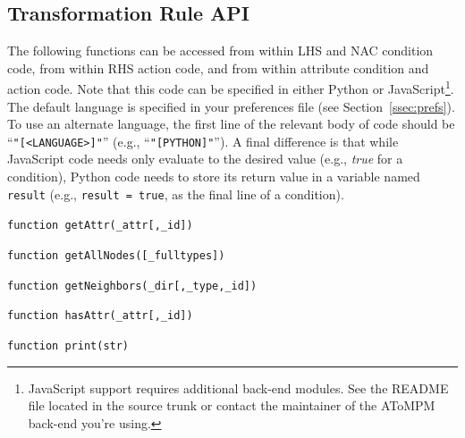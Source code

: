 \documentclass{article}
\numberwithin{equation}{section}
\numberwithin{figure}{section}
\begin{document}
\subsection{Transformation Rule API}
\label{ssec:trapi}
The following functions can be accessed from within LHS and NAC condition code, from within RHS action code, and from within attribute condition and action code. Note that this code can be specified in either Python or JavaScript\footnote{JavaScript support requires additional back-end modules. See the README file located in the source trunk or contact the maintainer of the AToMPM back-end you're using.}. The default language is specified in your preferences file (see Section~\ref{ssec:prefs}). To use an alternate language, the first line of the relevant body of code should be ``\texttt{"[<LANGUAGE>]"}'' (e.g., ``\texttt{"[PYTHON]"}''). A final difference is that while JavaScript code needs only evaluate to the desired value (e.g., \textit{true} for a condition), Python code needs to store its return value in a variable named \texttt{result} (e.g., \texttt{result = true}, as the final line of a condition).\\

\begin{center}	{\large \texttt{function getAttr(\_attr[,\_id])}} \end{center}


\begin{center}	{\large \texttt{function getAllNodes([\_fulltypes])}} \end{center}


\begin{center}	{\large \texttt{function getNeighbors(\_dir[,\_type,\_id])}} \end{center}


\begin{center}	{\large \texttt{function hasAttr(\_attr[,\_id])}} \end{center}


\begin{center}	{\large \texttt{function print(str)}} \end{center}
\end{document}
